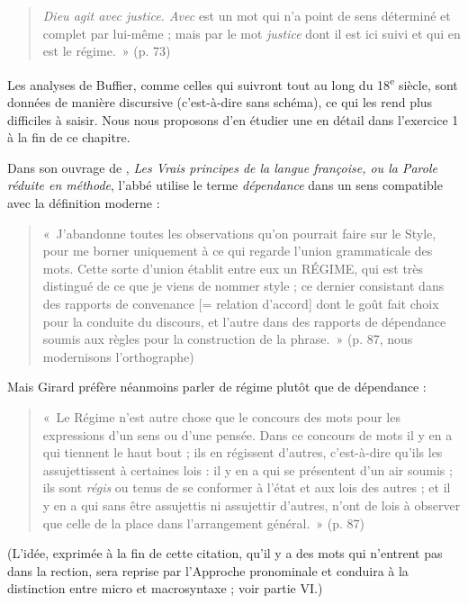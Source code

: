 {\begin{quote}
      \textit{Dieu agit avec justice. Avec} est un mot qui n’a point de sens déterminé et complet par lui-même ; mais par le mot \textit{justice} dont il est ici suivi et qui en est le régime.~» (p. 73) 
    \end{quote}
  Les analyses de Buffier, comme celles qui suivront tout au long du 18\textsuperscript{e} siècle, sont données de manière discursive (c’est-à-dire sans schéma), ce qui les rend plus difficiles à saisir. Nous nous proposons d’en étudier une en détail dans l'exercice 1 à la fin de ce chapitre.

    Dans son ouvrage de \citeyear{girard1747vrais}, \textit{Les Vrais principes de la langue françoise, ou la Parole réduite en méthode}, l’abbé  utilise le terme \textit{dépendance} dans un sens compatible avec la définition moderne :
    \begin{quote}
    «~J’abandonne toutes les observations qu’on pourrait faire sur le Style, pour me borner uniquement à ce qui regarde l’union grammaticale des mots. Cette sorte d’union établit entre eux un RÉGIME, qui est très distingué de ce que je viens de nommer style ; ce dernier consistant dans des rapports de convenance [= relation d’accord] dont le goût fait choix pour la conduite du discours, et l’autre dans des rapports de dépendance soumis aux règles pour la construction de la phrase.~» (p. 87, nous modernisons l’orthographe)\end{quote}
    Mais Girard préfère néanmoins parler de régime plutôt que de dépendance : 
    \begin{quote}«~Le Régime n’est autre chose que le concours des mots pour les expressions d’un sens ou d’une pensée. Dans ce concours de mots il y en a qui tiennent le haut bout ; ils en régissent d’autres, c’est-à-dire qu’ils les assujettissent à certaines lois : il y en a qui se présentent d’un air soumis ; ils sont \textit{régis} ou tenus de se conformer à l’état et aux lois des autres ; et il y en a qui sans être assujettis ni assujettir d’autres, n’ont de lois à observer que celle de la place dans l’arrangement général.~» (p. 87)\end{quote}
  (L’idée, exprimée à la fin de cette citation, qu’il y a des mots qui n’entrent pas dans la rection, sera reprise par l’Approche pronominale et conduira à la distinction entre micro et macrosyntaxe ; voir partie VI.)

}
